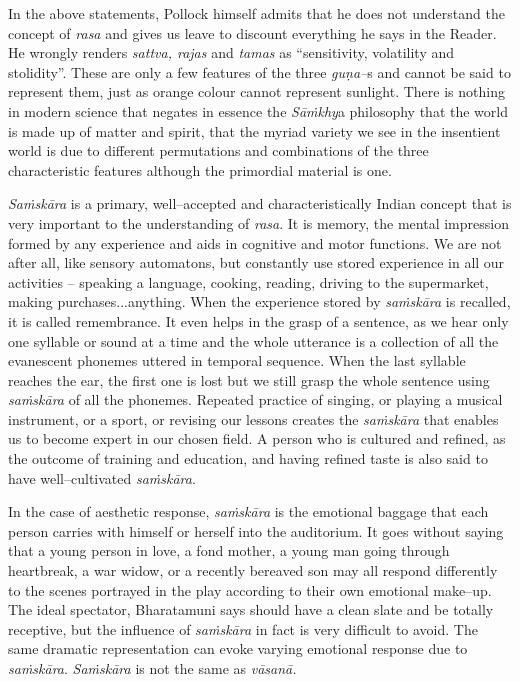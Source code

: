 In the above statements, Pollock himself admits that he does not understand the concept of \textit{rasa }and gives us leave to discount everything he says in the Reader. He wrongly renders \textit{sattva, rajas} and \textit{tamas} as “sensitivity, volatility and stolidity”. These are only a few features of the three \textit{guṇa–}s and cannot be said to represent them, just as orange colour cannot represent sunlight. There is nothing in modern science that negates in essence the \textit{Sāṁkhy}a philosophy that the world is made up of matter and spirit, that the myriad variety we see in the insentient world is due to different permutations and combinations of the three characteristic features although the primordial material is one.

\textit{Saṁskāra} is a primary, well–accepted and characteristically Indian concept that is very important to the understanding of \textit{rasa}. It is memory, the mental impression formed by any experience and aids in cognitive and motor functions. We are not after all, like sensory automatons, but constantly use stored experience in all our activities – speaking a language, cooking, reading, driving to the supermarket, making purchases...anything. When the experience stored by \textit{saṁskāra} is recalled, it is called remembrance. It even helps in the grasp of a sentence, as we hear only one syllable or sound at a time and the whole utterance is a collection of all the evanescent phonemes uttered in temporal sequence. When the last syllable reaches the ear, the first one is lost but we still grasp the whole sentence using \textit{saṁskāra} of all the phonemes. Repeated practice of singing, or playing a musical instrument, or a sport, or revising our lessons creates the \textit{saṁskāra} that enables us to become expert in our chosen field. A person who is cultured and refined, as the outcome of training and education, and having refined taste is also said to have well–cultivated \textit{saṁskāra}.

In the case of aesthetic response, \textit{saṁskāra} is the emotional baggage that each person carries with himself or herself into the auditorium. It goes without saying that a young person in love, a fond mother, a young man going through heartbreak, a war widow, or a recently bereaved son may all respond differently to the scenes portrayed in the play according to their own emotional make–up. The ideal spectator, Bharatamuni says should have a clean slate and be totally receptive, but the influence of \textit{saṁskāra} in fact is very difficult to avoid. The same dramatic representation can evoke varying emotional response due to \textit{saṁskāra}. \textit{Saṁskāra} is not the same as \textit{vāsanā.}

